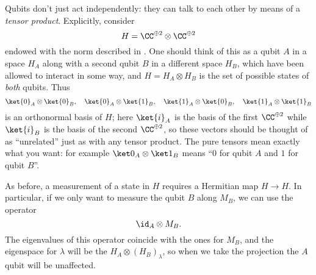 Qubits don't just act independently:
they can talk to each other by means of a \emph{tensor product}.
Explicitly, consider \[ H = \CC^{\oplus 2} \otimes \CC^{\oplus 2} \]
endowed with the norm described in .
One should think of this as a qubit $A$ in a space $H_A$
along with a second qubit $B$ in a different space $H_B$,
which have been allowed to interact in some way,
and $H = H_A \otimes H_B$ is the set of possible states of \emph{both} qubits.
Thus
\[
	\ket{0}_A \otimes \ket{0}_B, \quad
	\ket{0}_A \otimes \ket{1}_B, \quad
	\ket{1}_A \otimes \ket{0}_B, \quad
	\ket{1}_A \otimes \ket{1}_B
\]
is an orthonormal basis of $H$;
here $\ket{i}_A$ is the basis of the first $\CC^{\oplus 2}$
while $\ket{i}_B$ is the basis of the second $\CC^{\oplus 2}$,
so these vectors should be thought of as ``unrelated''
just as with any tensor product.
The pure tensors mean exactly what you want:
for example $\ket0_A \otimes \ket1_B$ means
``$0$ for qubit $A$ and $1$ for qubit $B$''.

As before, a measurement of a state in $H$ requires
a Hermitian map $H \to H$.
In particular, if we only want to measure the qubit $B$ along $M_B$,
we can use the operator \[ \id_A \otimes M_B. \]
The eigenvalues of this operator coincide with the ones for $M_B$,
and the eigenspace for $\lambda$ will be the $H_A \otimes (H_B)_\lambda$,
so when we take the projection the $A$ qubit will be unaffected.

